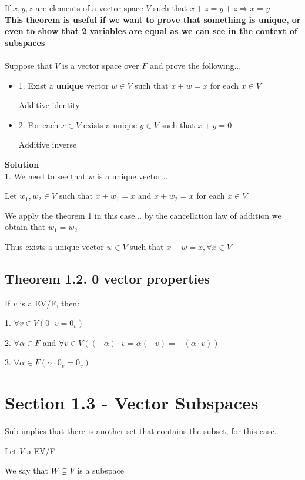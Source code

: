 \documentclass{article}
\begin{document}
If \(x, y, z\) are elements of a vector space \(V\) such that \(x+z=y+z \Rightarrow x= y\)
\\

\textbf{This theorem is useful if we want to prove that something is unique, or even to show that 2 variables are equal as we can see in the context of subspaces}
\\
\\
Suppose that \(V\) is a vector space over \(F\) and prove the following...
\begin{itemize}
    \item 1. Exist a \textbf{unique} vector \(w \in V\) such that \(x+w=x\) for each \(x \in V\)

    Additive identity
    \item 2. For each \(x \in V \) exists a unique \(y \in V\) such that \(x+y=0\)

    Additive inverse
\end{itemize}

\textbf{Solution}
\\
1. We need to see that \(w\) is a unique vector...

Let \(w_1, w_2 \in V\) such that \(x+w_1 = x\) and \(x+w_2=x\) for each \(x \in V\)

We apply the theorem 1 in this case... by the cancellation law of addition we obtain that \(w_1 = w_2\)

Thus exists a unique vector \(w \in V \) such that \(x+w=x, \forall x \in V\)

\subsection*{Theorem 1.2. 0 vector properties}
If \(v\) is a EV/F, then:

1. \(\forall v \in V (0\cdot v = 0_v)\)

2. \(\forall \alpha \in F\) and \(\forall v \in V ((-\alpha)\cdot v = \alpha (-v) = -(\alpha \cdot v))\) 

3. \( \forall \alpha \in F (\alpha \cdot 0_v = 0_v)\)

\section*{Section 1.3 - Vector Subspaces}

Sub implies that there is another set that contains the subset, for this case.

Let \(V \) a EV/F

We say that \(W \subsetneq V\) is a subspace
\end{document}
